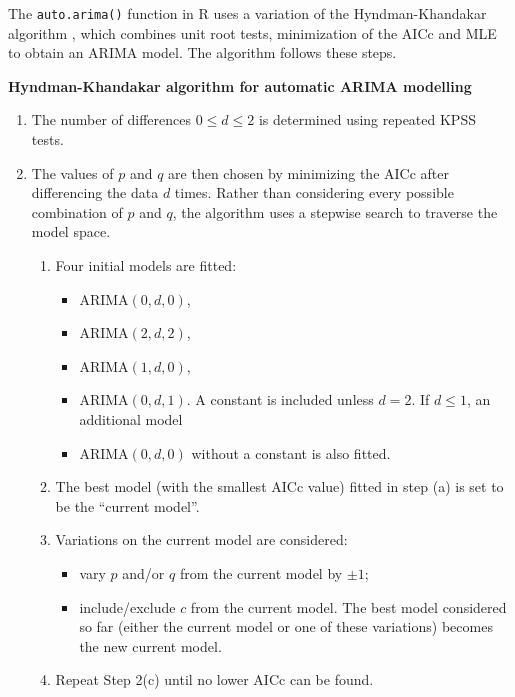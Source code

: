 \documentclass[]{book}
\providecommand{\tightlist}{%
  \setlength{\itemsep}{0pt}\setlength{\parskip}{0pt}}
\begin{document}
The \texttt{auto.arima()} function in R uses a variation of the Hyndman-Khandakar algorithm \citep{HK08}, which combines unit root tests, minimization of the AICc and MLE to obtain an ARIMA model. The algorithm follows these steps.

\textbf{Hyndman-Khandakar algorithm for automatic ARIMA modelling}

\begin{enumerate}
\def\labelenumi{\arabic{enumi}.}
\tightlist
\item
  The number of differences \(0 \le d\le 2\) is determined using repeated KPSS tests.
\item
  The values of \(p\) and \(q\) are then chosen by minimizing the AICc after differencing the data \(d\) times. Rather than considering every possible combination of \(p\) and \(q\), the algorithm uses a stepwise search to traverse the model space.

  \begin{enumerate}
  \def\labelenumii{(\alph{enumii})}
  \tightlist
  \item
    Four initial models are fitted:

    \begin{itemize}
    \tightlist
    \item
      ARIMA\((0,d,0)\),
    \item
      ARIMA\((2,d,2)\),
    \item
      ARIMA\((1,d,0)\),
    \item
      ARIMA\((0,d,1)\).
      A constant is included unless \(d=2\). If \(d \le 1\), an additional model
    \item
      ARIMA\((0,d,0)\) without a constant
      is also fitted.
    \end{itemize}
  \item
    The best model (with the smallest AICc value) fitted in step (a) is set to be the ``current model''.
  \item
    Variations on the current model are considered:

    \begin{itemize}
    \tightlist
    \item
      vary \(p\) and/or \(q\) from the current model by \(\pm1\);
    \item
      include/exclude \(c\) from the current model.
      The best model considered so far (either the current model or one of these variations) becomes the new current model.
    \end{itemize}
  \item
    Repeat Step 2(c) until no lower AICc can be found.
  \end{enumerate}
\end{enumerate}
\end{document}

